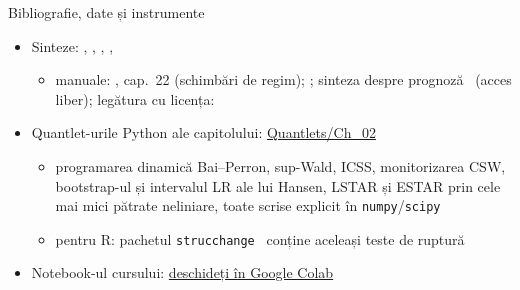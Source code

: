 \begin{frame}{Bibliografie, date și instrumente}
\itemsize{\small}
\begin{itemize}
    \item Sinteze: , , , , 
    \begin{itemize}
        \item manuale: , cap.~22 (schimbări de regim); ; sinteza despre prognoză \ (acces liber); legătura cu licența: 
    \end{itemize}
    \item Quantlet-urile Python ale capitolului: \href{https://github.com/danpele/Advanced-Time-Series/tree/main/Quantlets/Ch_02}{Quantlets/Ch\_02}
    \begin{itemize}
        \item programarea dinamică Bai--Perron, sup-Wald, ICSS, monitorizarea CSW, bootstrap-ul și intervalul LR ale lui Hansen, LSTAR și ESTAR prin cele mai mici pătrate neliniare, toate scrise explicit în \texttt{numpy}/\texttt{scipy}
        \item pentru R: pachetul \texttt{strucchange} \ conține aceleași teste de ruptură
    \end{itemize}
    \item Notebook-ul cursului: \href{\colaburl{notebooks/EN/chapter2_lecture_notebook.ipynb}}{deschideți în Google Colab}
\end{itemize}
\end{frame}

